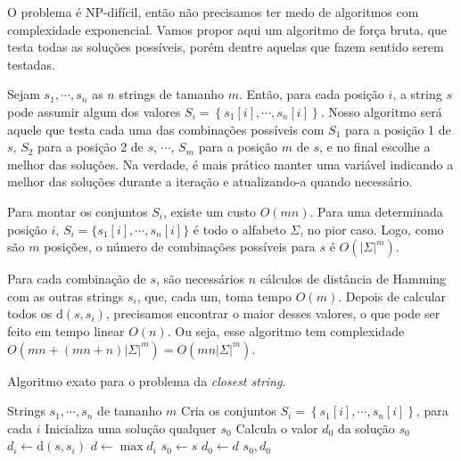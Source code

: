 O problema é NP-difícil, então não precisamos ter medo de algoritmos com complexidade exponencial. Vamos propor aqui um algoritmo de força bruta, que testa todas as soluções possíveis, porém dentre aquelas que fazem sentido serem testadas.

Sejam $s_1, \cdots, s_n$ as $n$ strings de tamanho $m$. Então, para cada posição $i$, a string $s$ pode assumir algum dos valores $S_i = \left\{s_1[i], \cdots, s_n[i]\right\}$. Nosso algoritmo será aquele que testa cada uma das combinações possíveis com $S_1$ para a posição 1 de $s$, $S_2$ para a posição 2 de $s$, $\cdots$, $S_m$ para a posição $m$ de $s$, e no final escolhe a melhor das soluções. Na verdade, é mais prático manter uma variável indicando a melhor das soluções durante a iteração e atualizando-a quando necessário.

Para montar os conjuntos $S_i$, existe um custo $O(mn)$. Para uma determinada posição $i$, $S_i = \{s_1[i], \cdots, s_n[i]\}$ é todo o alfabeto $\Sigma$, no pior caso. Logo, como são $m$ posições, o número de combinações possíveis para $s$ é $O(|\Sigma|^m)$.

Para cada combinação de $s$, são necessários $n$ cálculos de distância de Hamming com as outras strings $s_i$, que, cada um, toma tempo $O(m)$.
Depois de calcular todos os $\text{d}(s, s_i)$, precisamos encontrar o maior desses valores, o que pode ser feito em tempo linear $O(n)$.
Ou seja, esse algoritmo tem complexidade $O(mn + (mn+n)|\Sigma|^m) = O(mn|\Sigma|^m)$.

\begin{algorithm}
    \caption{Algoritmo exato para o problema da \textit{closest string}.}
    \label{alg:exact}
    \begin{algorithmic}
        \Require Strings $s_1, \cdots, s_n$ de tamanho $m$
        \State Cria os conjuntos $S_i = \left\{s_1[i], \cdots, s_n[i]\right\}$, para cada $i$
        \State Inicializa uma solução qualquer $s_0$
        \State Calcula o valor $d_0$ da solução $s_0$
                \State $d_i \gets \text{d}(s, s_i)$
            \EndFor
            \State $d \gets \max d_i$
                \State $s_0 \gets s$
                \State $d_0 \gets d$
            \EndIf
        \EndFor
        \State \Return $s_0, d_0$
    \end{algorithmic}
\end{algorithm}